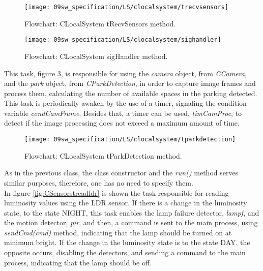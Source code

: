 \begin{figure}[H]
	\centering
	\texttt{[image: 09sw\_specification/LS/clocalsystem/trecvsensors]}
	\caption{Flowchart: CLocalSystem tRecvSensors method.}
	\label{fig:CLocalSystemtRecvSensors}
\end{figure}

\begin{figure}[H]
	\centering
	\texttt{[image: 09sw\_specification/LS/clocalsystem/sighandler]}
	\caption{Flowchart: CLocalSystem sigHandler method.}
	\label{fig:CLocalSystemsigHandler}
\end{figure}

\clearpage
This task, figure \ref{fig:CLocalSystemtParkDetection}, is responsible for using the \textit{camera} object, from \textit{CCamera}, and the \textit{park} object, from \textit{CParkDetection}, in order to capture image frames and process them, calculating the number of available spaces in the parking detected. This task is periodically awaken by the use of a timer, signaling the condition variable \textit{condCamFrame}. Besides that, a timer can be used, \textit{timCamProc}, to detect if the image processing does not exceed a maximum amount of time.

\begin{figure}[H]
	\centering
	\texttt{[image: 09sw\_specification/LS/clocalsystem/tparkdetection]}
	\caption{Flowchart: CLocalSystem tParkDetection method.}
	\label{fig:CLocalSystemtParkDetection}
\end{figure}

\clearpage
{}

As in the previous class, the class constructor and the \textit{run()} method serves similar purposes, therefore, one has no need to specify them.\\

In figure \ref{fig:CSensorstreadldr} is shown the task responsible for reading luminosity values using the LDR sensor. If there is a change in the luminosity state, to the state NIGHT, this task enables the lamp failure detector, \textit{lampf}, and the motion detector, \textit{pir}, and then, a command is sent to the main process, using \textit{sendCmd(cmd)} method, indicating that the lamp should be turned on at minimum bright. If the change in the luminosity state is to the state DAY, the opposite occurs, disabling the detectors, and sending a command to the main process, indicating that the lamp should be off.


